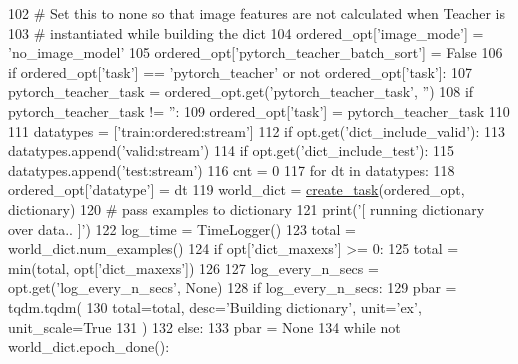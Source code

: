 \begin{DoxyCode}
102     \textcolor{comment}{# Set this to none so that image features are not calculated when Teacher is}
103     \textcolor{comment}{# instantiated while building the dict}
104     ordered\_opt[\textcolor{stringliteral}{'image\_mode'}] = \textcolor{stringliteral}{'no\_image\_model'}
105     ordered\_opt[\textcolor{stringliteral}{'pytorch\_teacher\_batch\_sort'}] = \textcolor{keyword}{False}
106     \textcolor{keywordflow}{if} ordered\_opt[\textcolor{stringliteral}{'task'}] == \textcolor{stringliteral}{'pytorch\_teacher'} \textcolor{keywordflow}{or} \textcolor{keywordflow}{not} ordered\_opt[\textcolor{stringliteral}{'task'}]:
107         pytorch\_teacher\_task = ordered\_opt.get(\textcolor{stringliteral}{'pytorch\_teacher\_task'}, \textcolor{stringliteral}{''})
108         \textcolor{keywordflow}{if} pytorch\_teacher\_task != \textcolor{stringliteral}{''}:
109             ordered\_opt[\textcolor{stringliteral}{'task'}] = pytorch\_teacher\_task
110 
111     datatypes = [\textcolor{stringliteral}{'train:ordered:stream'}]
112     \textcolor{keywordflow}{if} opt.get(\textcolor{stringliteral}{'dict\_include\_valid'}):
113         datatypes.append(\textcolor{stringliteral}{'valid:stream'})
114     \textcolor{keywordflow}{if} opt.get(\textcolor{stringliteral}{'dict\_include\_test'}):
115         datatypes.append(\textcolor{stringliteral}{'test:stream'})
116     cnt = 0
117     \textcolor{keywordflow}{for} dt \textcolor{keywordflow}{in} datatypes:
118         ordered\_opt[\textcolor{stringliteral}{'datatype'}] = dt
119         world\_dict = \hyperlink{namespaceparlai_1_1core_1_1worlds_a11923c10b545c7ecc1b08fe2242d9c2c}{create\_task}(ordered\_opt, dictionary)
120         \textcolor{comment}{# pass examples to dictionary}
121         print(\textcolor{stringliteral}{'[ running dictionary over data.. ]'})
122         log\_time = TimeLogger()
123         total = world\_dict.num\_examples()
124         \textcolor{keywordflow}{if} opt[\textcolor{stringliteral}{'dict\_maxexs'}] >= 0:
125             total = min(total, opt[\textcolor{stringliteral}{'dict\_maxexs'}])
126 
127         log\_every\_n\_secs = opt.get(\textcolor{stringliteral}{'log\_every\_n\_secs'}, \textcolor{keywordtype}{None})
128         \textcolor{keywordflow}{if} log\_every\_n\_secs:
129             pbar = tqdm.tqdm(
130                 total=total, desc=\textcolor{stringliteral}{'Building dictionary'}, unit=\textcolor{stringliteral}{'ex'}, unit\_scale=\textcolor{keyword}{True}
131             )
132         \textcolor{keywordflow}{else}:
133             pbar = \textcolor{keywordtype}{None}
134         \textcolor{keywordflow}{while} \textcolor{keywordflow}{not} world\_dict.epoch\_done():

\end{DoxyCode}
